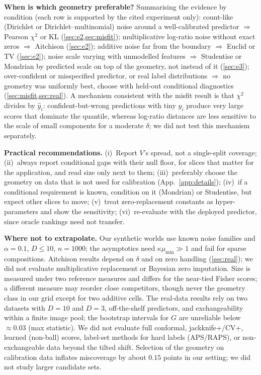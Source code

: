 \documentclass{article}
\theoremstyle{plain}
\theoremstyle{remark}
\newcommand{\yh}{\hat y}
\begin{document}
\textbf{When is which geometry preferable?} Summarising the evidence by condition (each row is supported by the cited experiment only): count-like (Dirichlet or Dirichlet--multinomial) noise around a well-calibrated predictor $\Rightarrow$ Pearson $\chi^2$ or KL (\cref{sec:e2,sec:misfit}); multiplicative log-ratio noise without exact zeros $\Rightarrow$ Aitchison (\cref{sec:e2}); additive noise far from the boundary $\Rightarrow$ Euclid or TV (\cref{sec:e2}); noise scale varying with unmodelled features $\Rightarrow$ Studentise or Mondrian by predicted scale on top of the geometry, not instead of it (\cref{sec:e3}); over-confident or misspecified predictor, or real label distributions $\Rightarrow$ no geometry was uniformly best, choose with held-out conditional diagnostics (\cref{sec:misfit,sec:real}). A mechanism consistent with the misfit result is that $\chi^2$ divides by $\yh_i$: confident-but-wrong predictions with tiny $\yh_i$ produce very large scores that dominate the quantile, whereas log-ratio distances are less sensitive to the scale of small components for a moderate $\delta$; we did not test this mechanism separately.

\textbf{Practical recommendations.} (i)~Report $V$'s spread, not a single-split coverage; (ii)~always report conditional gaps with their null floor, for slices that matter for the application, and read size only next to them; (iii)~preferably choose the geometry on data that is not used for calibration (App.~\ref{app:details}); (iv)~if a conditional requirement is known, condition on it (Mondrian) or Studentise, but expect other slices to move; (v)~treat zero-replacement constants as hyper-parameters and show the sensitivity; (vi)~re-evaluate with the deployed predictor, since oracle rankings need not transfer.

\textbf{Where not to extrapolate.} Our synthetic worlds use known noise families and $\alpha=0.1$, $D\le10$, $n=1000$; the asymptotics need $\kappa\mu_{\min}\gg1$ and fail for sparse compositions. Aitchison results depend on $\delta$ and on zero handling (\cref{sec:real}); we did not evaluate multiplicative replacement or Bayesian zero imputation. Size is measured under two reference measures and differs for the near-tied Fisher scores; a different measure may reorder close competitors, though never the geometry class in our grid except for two additive cells. The real-data results rely on two datasets with $D=10$ and $D=3$, off-the-shelf predictors, and exchangeability within a finite image pool; the bootstrap intervals for $G$ are unreliable below $\approx0.03$ (max statistic). We did not evaluate full conformal, jackknife+/CV+, learned (non-ball) scores, label-set methods for hard labels (APS/RAPS), or non-exchangeable data beyond the tilted shift. Selection of the geometry on calibration data inflates miscoverage by about $0.15$ points in our setting; we did not study larger candidate sets.
\end{document}
